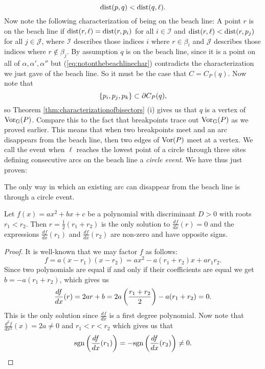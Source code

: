 \begin{equation} \label{eq:notonthebeachlinechar}
    \operatorname{dist}(p, q) < \operatorname{dist}(q, \ell).
\end{equation}
Now note the following characterization of being on the beach line: A point $r$ is on the beach line if $\operatorname{dist}(r, \ell) = \operatorname{dist}(r, p_i)$ for all $i \in \mathcal{I}$ and $\operatorname{dist}(r, \ell) < \operatorname{dist}(r, p_j)$ for all $j \in \mathcal{J}$, where $\mathcal{I}$ describes those indices $i$ where $r \in \beta_i$ and $\mathcal{J}$ describes those indices where $r \not\in \beta_j$. By assumption $q$ is on the beach line, since it is a point on all of $\alpha, \alpha', \alpha''$ but (\ref{eq:notonthebeachlinechar}) contradicts the characterization we just gave of the beach line. So it must be the case that $C = C_P(q)$. Now note that
\[
    \{p_i, p_j, p_k\} \subset \partial C_P(q),
\]
so Theorem \ref{thm:characterizationofbisectors} (i) gives us that $q$ is a vertex of $\operatorname{Vor_{G}}(P)$. Compare this to the fact that breakpoints trace out $\operatorname{Vor_{G}}(P)$ as we proved earlier. This means that when two breakpoints meet and an arc disappears from the beach line, then two edges of $\operatorname{Vor}(P)$ meet at a vertex. We call the event when $\ell$ reaches the lowest point of a circle through three sites defining consecutive arcs on the beach line a \emph{circle event}. We have thus just proven:
\begin{lem}
The only way in which an existing arc can disappear from the beach line is through a circle event.
\end{lem}

\newpage
\begin{prop} \label{prop:highschool1}
Let $f(x) = a x^2 + b x + c$ be a polynomial with discriminant $D > 0$ with roots $r_1 < r_2$. Then $r = \tfrac{1}{2}(r_1 + r_2)$ is the only solution to $\displaystyle\frac{df}{dx}(r) = 0$ and the expressions $\displaystyle\frac{df}{dx}(r_1)$ and $\displaystyle\frac{df}{dx}(r_2)$ are non-zero and have opposite signs.
\end{prop}
\begin{proof}
It is well-known that we may factor $f$ as follows:
\[
    f = a (x - r_1) (x - r_2) = a x^2 - a(r_1 + r_2) x + a r_1 r_2.
\]
Since two polynomials are equal if and only if their coefficients are equal we get $b = - a (r_1 + r_2)$, which gives us
\[
    \frac{df}{dx} (r) = 2 a r + b = 2 a \left(\frac{r_1 + r_2}{2}\right) - a (r_1 + r_2) = 0.
\]
This is the only solution since $\displaystyle\frac{df}{dx}$ is a first degree polynomial. Now note that $\displaystyle\frac{d^2 f}{d x^2}(x) = 2a \ne 0$ and $r_1 < r < r_2$ which gives us that
\[
    \text{sgn} \left(\frac{df}{dx}(r_1)\right) = -\text{sgn} \left(\frac{df}{dx}(r_2)\right) \ne 0.
\]
\end{proof}

